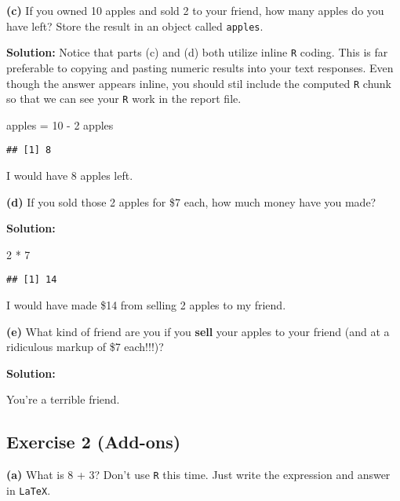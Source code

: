 \documentclass[
]{article}
\newenvironment{Shaded}{\begin{snugshade}}{\end{snugshade}}
\newcommand{\DecValTok}[1]{\textcolor[rgb]{0.00,0.00,0.81}{#1}}
\newcommand{\NormalTok}[1]{#1}
\newcommand{\OtherTok}[1]{\textcolor[rgb]{0.56,0.35,0.01}{#1}}
\newcommand{\SpecialCharTok}[1]{\textcolor[rgb]{0.00,0.00,0.00}{#1}}
\begin{document}
\textbf{(c)} If you owned 10 apples and sold 2 to your friend, how many
apples do you have left? Store the result in an object called
\texttt{apples}.

\textbf{Solution:} Notice that parts (c) and (d) both utilize inline
\texttt{R} coding. This is far preferable to copying and pasting numeric
results into your text responses. Even though the answer appears inline,
you should stil include the computed \texttt{R} chunk so that we can see
your \texttt{R} work in the report file.

\begin{Shaded}
\begin{Highlighting}[]
\NormalTok{apples }\OtherTok{=} \DecValTok{10} \SpecialCharTok{{-}} \DecValTok{2}
\NormalTok{apples}
\end{Highlighting}
\end{Shaded}

\begin{verbatim}
## [1] 8
\end{verbatim}

I would have 8 apples left.

\textbf{(d)} If you sold those 2 apples for \$7 each, how much money
have you made?

\textbf{Solution:}

\begin{Shaded}
\begin{Highlighting}[]
\DecValTok{2} \SpecialCharTok{*} \DecValTok{7}
\end{Highlighting}
\end{Shaded}

\begin{verbatim}
## [1] 14
\end{verbatim}

I would have made \$14 from selling 2 apples to my friend.

\textbf{(e)} What kind of friend are you if you \textbf{sell} your
apples to your friend (and at a ridiculous markup of \$7 each!!!)?

\textbf{Solution:}

You're a terrible friend.

\hypertarget{exercise-2-add-ons}{%
\subsection{Exercise 2 (Add-ons)}\label{exercise-2-add-ons}}

\textbf{(a)} What is 8 + 3? Don't use \texttt{R} this time. Just write
the expression and answer in \texttt{LaTeX}.
\end{document}
